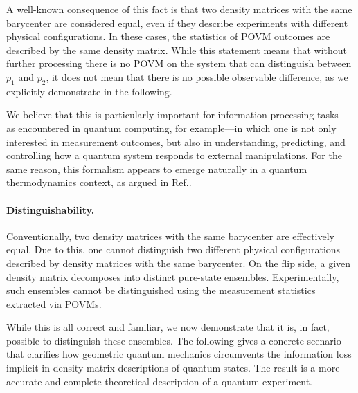 \documentclass[draft,nofootinbib,prl,twocolumn,showpacs,showkeys,groupaddress,preprintnumbers,floatfix]{revtex4-1}
\newcommand{\1}{\mathbbm{1}}
\begin{document}
A well-known consequence of this fact is that two density matrices with the
same barycenter are considered equal, even if they describe experiments with
different physical configurations. In these cases, the statistics of POVM
outcomes are described by the same density matrix. While this statement means
that without further processing there is no POVM on the system that can distinguish 
between $p_1$ and $p_2$, it does not mean that there is no possible observable
difference, as we explicitly demonstrate in the following. 

We believe that this is particularly important for information processing
tasks---as encountered in quantum computing, for example---in which one is not
only interested in measurement outcomes, but also in understanding, predicting,
and controlling how a quantum system responds to external manipulations. For the
same reason, this formalism appears to emerge naturally in a quantum thermodynamics
context, as argued in Ref.\cite{Anza20a}.\\


\paragraph*{Distinguishability.}\label{sec:distinguishability}
Conventionally, two density matrices with the same barycenter are effectively
equal. Due to this, one cannot distinguish two different physical
configurations described by density matrices with the same barycenter. On the
flip side, a given density matrix decomposes into distinct pure-state
ensembles. Experimentally, such ensembles cannot be distinguished using the
measurement statistics extracted via POVMs.

While this is all correct and familiar, we now demonstrate that it is, in fact,
possible to distinguish these ensembles. The following gives a concrete
scenario that clarifies how geometric quantum mechanics circumvents the
information loss implicit in density matrix descriptions of quantum states. The
result is a more accurate and complete theoretical description of a quantum
experiment.
\end{document}
